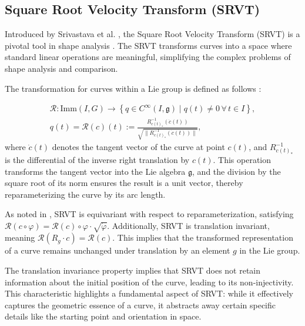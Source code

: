 \subsection{Square Root Velocity Transform (SRVT)}
\label{subsec:square-root-velocity-transform}

Introduced by Srivastava et al. \cite{srivastavaShapeAnalysisElastic2011}, the Square Root Velocity Transform (SRVT) is a pivotal tool in shape analysis \cite{bauerConstructingReparametrizationInvariant2014, bauerOverviewGeometriesShape2014, bauerLandmarkGuidedElasticShape2015, celledoniShapeAnalysisHomogeneous2018, celledoniShapeAnalysisLie2016, celledoniSignaturesShapeAnalysis2019, schmedingIntroductionInfinitedimensionalDifferential2022, tumpachTemporalAlignmentHuman2023}. The SRVT transforms curves into a space where standard linear operations are meaningful, simplifying the complex problems of shape analysis and comparison.

The transformation for curves within a Lie group is defined as follows \cite{celledoniShapeAnalysisLie2016}:

\begin{equation}
    \begin{aligned}
        \mathcal{R}: \mathrm{Imm}(I, G) \rightarrow \left\{q \in C^\infty(I, \mathfrak{g}) \mid q(t) \neq 0  \, \forall \, t \in I\right\}, \\
        q(t) = \mathcal{R}(c)(t) := \frac{R^{-1}_{c(t)_*}(\dot c(t))}{\sqrt{\|R^{-1}_{c(t)_*}(\dot c(t))\|}},
    \end{aligned}
    \label{eq:SRVT}
\end{equation}
where \(\dot{c}(t)\) denotes the tangent vector of the curve at point \(c(t)\), and \(R^{-1}_{c(t)_*}\) is the differential of the inverse right translation by \(c(t)\). This operation transforms the tangent vector into the Lie algebra \(\mathfrak{g}\), and the division by the square root of its norm ensures the result is a unit vector, thereby reparameterizing the curve by its arc length.

As noted in \cite{celledoniShapeAnalysisLie2016}, SRVT is equivariant with respect to reparameterization, satisfying \(\mathcal{R}(c \circ \varphi) = \mathcal{R}(c) \circ \varphi \cdot \sqrt{\dot{\varphi}}\). Additionally, SRVT is translation invariant, meaning \(\mathcal{R}(R_g \cdot c ) = \mathcal{R}(c)\). This implies that the transformed representation of a curve remains unchanged under translation by an element \(g\) in the Lie group.

The translation invariance property implies that SRVT does not retain information about the initial position of the curve, leading to its non-injectivity. This characteristic highlights a fundamental aspect of SRVT: while it effectively captures the geometric essence of a curve, it abstracts away certain specific details like the starting point and orientation in space. 

